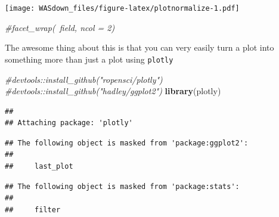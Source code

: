 \documentclass[]{book}
\newenvironment{Shaded}{\begin{snugshade}}{\end{snugshade}}
\newcommand{\KeywordTok}[1]{\textcolor[rgb]{0.13,0.29,0.53}{\textbf{{#1}}}}
\newcommand{\DataTypeTok}[1]{\textcolor[rgb]{0.13,0.29,0.53}{{#1}}}
\newcommand{\StringTok}[1]{\textcolor[rgb]{0.31,0.60,0.02}{{#1}}}
\newcommand{\CommentTok}[1]{\textcolor[rgb]{0.56,0.35,0.01}{\textit{{#1}}}}
\newcommand{\NormalTok}[1]{{#1}}
\theoremstyle{definition}
\theoremstyle{definition}
\theoremstyle{remark}
\begin{document}
\begin{Shaded}
\end{Shaded}

\texttt{[image: WASdown\_files/figure-latex/plotnormalize-1.pdf]}

\begin{Shaded}
\begin{Highlighting}[]
  \CommentTok{#facet_wrap(~field, ncol = 2)}
\end{Highlighting}
\end{Shaded}

The awesome thing about this is that you can very easily turn a plot
into something more than just a plot using \texttt{plotly}

\begin{Shaded}
\begin{Highlighting}[]
\CommentTok{#devtools::install_github("ropensci/plotly")}
\CommentTok{#devtools::install_github("hadley/ggplot2")}
\KeywordTok{library}\NormalTok{(plotly)}
\end{Highlighting}
\end{Shaded}

\begin{verbatim}
## 
## Attaching package: 'plotly'
\end{verbatim}

\begin{verbatim}
## The following object is masked from 'package:ggplot2':
## 
##     last_plot
\end{verbatim}

\begin{verbatim}
## The following object is masked from 'package:stats':
## 
##     filter
\end{verbatim}
\end{document}
